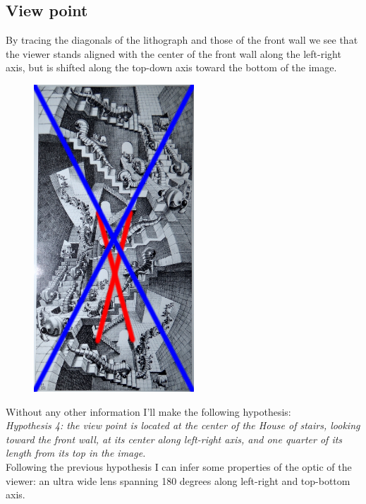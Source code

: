 \documentclass[12pt, a4paper]{article}
\begin{document}
\subsection{View point}

By tracing the diagonals of the lithograph and those of the front wall we see that the viewer stands aligned with the center of the front wall along the left-right axis, but is shifted along the top-down axis toward the bottom of the image.\\

\begin{center}
\begin{figure}[H]
\centering\includegraphics[width=6cm]{./viewpoint.png}\\
\end{figure}
\end{center}

Without any other information I'll make the following hypothesis:\\

\emph{Hypothesis 4: the view point is located at the center of the House of stairs, looking toward the front wall, at its center along left-right axis, and one quarter of its length from its top in the image.}\\

Following the previous hypothesis I can infer some properties of the optic of the viewer: an ultra wide lens spanning 180 degrees along left-right and top-bottom axis.\\
\end{document}
